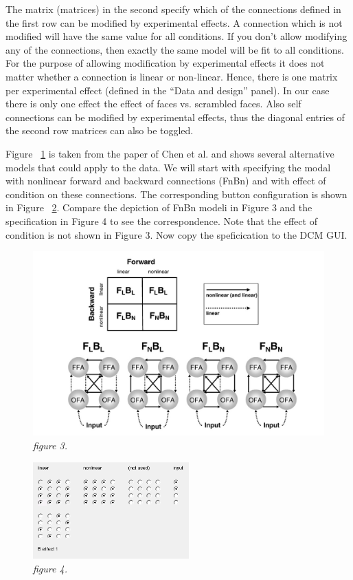The matrix (matrices) in the second specify which of the connections defined in the first row can be modified by experimental effects. A connection which is not modified will have the same value for all conditions. If you don't allow modifying any of the connections, then exactly the same model will be fit to all conditions. For the purpose of allowing modification by experimental effects it does not matter whether a connection is linear or non-linear. Hence, there is one matrix per experimental effect (defined in the ``Data and design'' panel). In our case there is only one effect the effect of faces vs. scrambled faces. Also self connections can be modified by experimental effects, thus the diagonal entries of the second row matrices can also be toggled.

Figure ~\ref{dcm-ir:fig:3} is taken from the paper of Chen et al. \cite{cc_asymm} and shows several alternative models that could apply to the data. We will start with specifying the modal with nonlinear forward and backward connections (FnBn) and with effect of condition on these connections. The corresponding button configuration is shown in Figure ~\ref{dcm-ir:fig:4}. Compare the depiction of FnBn modeli in Figure 3 and the specification in Figure 4 to see the correspondence. Note that the effect of condition is not shown in Figure 3. Now copy the speficication to the DCM GUI.

\begin{figure}
\begin{center}
\includegraphics[width=160mm]{dcm_ir/figures/figure3}
\caption{\em  figure 3. \label{dcm-ir:fig:3}}
\end{center}
\end{figure}

\begin{figure}
\begin{center}
\includegraphics[width=60mm]{dcm_ir/figures/figure4}
\caption{\em  figure 4. \label{dcm-ir:fig:4}}
\end{center}
\end{figure}

